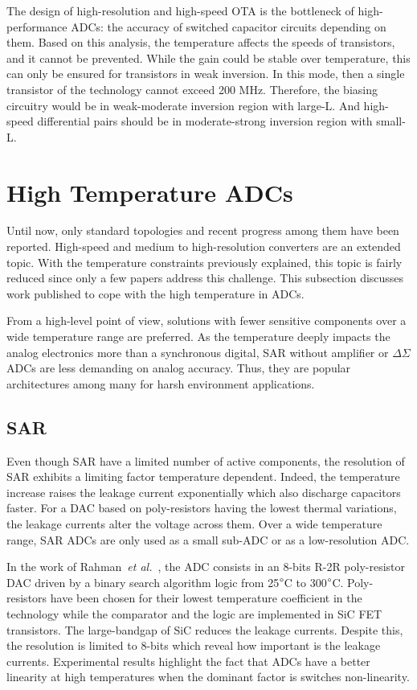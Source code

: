 The design of high-resolution and high-speed OTA is the bottleneck of high-performance ADCs: the accuracy of switched capacitor circuits depending on them. Based on this analysis, the temperature affects the speeds of transistors, and it cannot be prevented. While the gain could be stable over temperature, this can only be ensured for transistors in weak inversion. In this mode, then a single transistor of the technology cannot exceed 200 MHz.
Therefore, the biasing circuitry would be in weak-moderate inversion region with large-L. And high-speed differential pairs should be in moderate-strong inversion region with small-L.

\clearpage
\section{High Temperature ADCs}     %
\label{sec:high-temp-adc}
Until now, only standard topologies and recent progress among them have been reported. High-speed and medium to high-resolution converters are an extended topic. With the temperature constraints previously explained, this topic is fairly reduced since only a few papers address this challenge. This subsection discusses work published to cope with the high temperature in ADCs.

From a high-level point of view, solutions with fewer sensitive components over a wide temperature range are preferred. As the temperature deeply impacts the analog electronics more than a synchronous digital, SAR without amplifier or \(\Delta\Sigma \) ADCs are less demanding on analog accuracy. Thus, they are popular architectures among many for harsh environment applications.

\subsection{SAR}
Even though SAR have a limited number of active components, the resolution of SAR exhibits a limiting factor temperature dependent. Indeed, the temperature increase raises the leakage current exponentially which also discharge capacitors faster. For a DAC based on poly-resistors having the lowest thermal variations, the leakage currents alter the voltage across them. Over a wide temperature range, SAR ADCs are only used as a small sub-ADC or as a low-resolution ADC\@. %

In the work of Rahman~\textit{et al.}~\cite{Rahman2017}, the ADC consists in an 8-bits R-2R poly-resistor DAC driven by a binary search algorithm logic from 25\(\degree \)C to 300\(\degree \)C. Poly-resistors have been chosen for their lowest temperature coefficient in the technology while the comparator and the logic are implemented in SiC FET transistors. The large-bandgap of SiC reduces the leakage currents. Despite this, the resolution is limited to 8-bits which reveal how important is the leakage currents. Experimental results highlight the fact that ADCs have a better linearity at high temperatures when the dominant factor is switches non-linearity.

